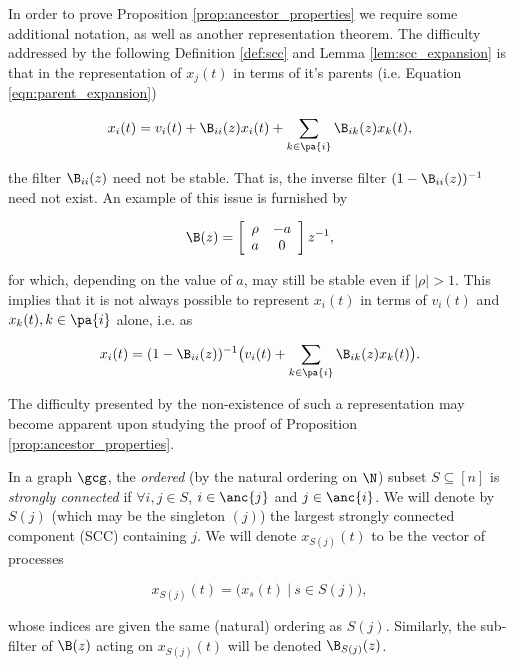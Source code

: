 \begin{remark}
  In order to prove Proposition \ref{prop:ancestor_properties} we
  require some additional notation, as well as another representation
  theorem.  The difficulty addressed by the following Definition
  \ref{def:scc} and Lemma \ref{lem:scc_expansion} is that in the
  representation of $x_j(t)$ in terms of it's parents (i.e. Equation
  \eqref{eqn:parent_expansion})

  \[
    x_i(t) = v_i(t) + \B_{ii}(z)x_i(t) + \sum_{k \in \pa{i}}\B_{ik}(z)x_k(t),
  \]

  the filter $\B_{ii}(z)$ need not be stable.  That is, the inverse
  filter $(1 - \B_{ii}(z))^{-1}$ need not exist.  An example of this
  issue is furnished by

  \[
    \B(z) = \left[
    \begin{array}{cc}
      \rho & -a\\
      a & 0\\
    \end{array}
  \right] z^{-1},
  \]

  for which, depending on the value of $a$, may still be stable even
  if $|\rho| > 1$.  This implies that it is not always possible to
  represent $x_i(t)$ in terms of $v_i(t)$ and $x_k(t), k \in \pa{i}$
  alone, i.e. as

  \[
    x_i(t) = (1 - \B_{ii}(z))^{-1}\big(v_i(t) + \sum_{k \in \pa{i}}\B_{ik}(z)x_k(t)\big).
  \]

  The difficulty presented by the non-existence of such a
  representation may become apparent upon studying the proof of
  Proposition \ref{prop:ancestor_properties}.
\end{remark}

\begin{definition}
  \label{def:scc}
  In a graph $\gcg$, the \textit{ordered} (by the natural ordering on
  $\N$) subset $S \subseteq [n]$ is \textit{strongly connected} if
  $\forall i, j \in S$, $i \in \anc{j}$ and $j \in \anc{i}$.  We will
  denote by $S(j)$ (which may be the singleton $(j)$) the largest
  strongly connected component (SCC) containing $j$.  We will denote
  $x_{S(j)}(t)$ to be the vector of processes

  \[
    x_{S(j)}(t) = \big(x_s(t)\ |\ s \in S(j)\big),
  \]

  whose indices are given the same (natural) ordering as $S(j)$.
  Similarly, the sub-filter of $\B(z)$ acting on $x_{S(j)}(t)$ will be
  denoted $\B_{S(j)}(z)$.
\end{definition}

